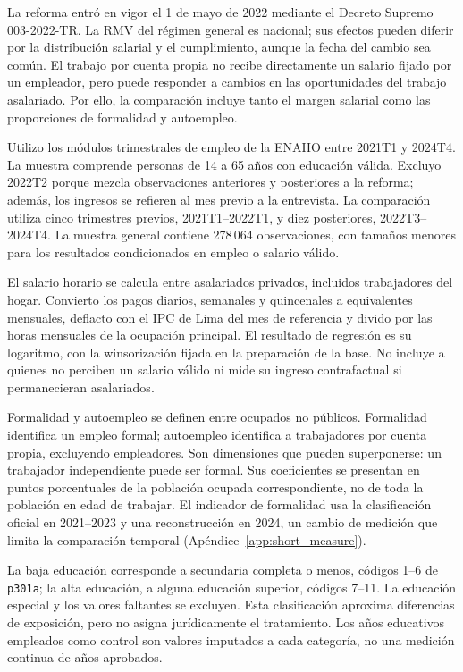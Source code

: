 La reforma entró en vigor el 1 de mayo de 2022 mediante el Decreto Supremo 003-2022-TR. La RMV del régimen general es nacional; sus efectos pueden diferir por la distribución salarial y el cumplimiento, aunque la fecha del cambio sea común. El trabajo por cuenta propia no recibe directamente un salario fijado por un empleador, pero puede responder a cambios en las oportunidades del trabajo asalariado. Por ello, la comparación incluye tanto el margen salarial como las proporciones de formalidad y autoempleo.

Utilizo los módulos trimestrales de empleo de la ENAHO entre 2021T1 y 2024T4. La muestra comprende personas de 14 a 65 años con educación válida. Excluyo 2022T2 porque mezcla observaciones anteriores y posteriores a la reforma; además, los ingresos se refieren al mes previo a la entrevista. La comparación utiliza cinco trimestres previos, 2021T1--2022T1, y diez posteriores, 2022T3--2024T4. La muestra general contiene 278\,064 observaciones, con tamaños menores para los resultados condicionados en empleo o salario válido.

El salario horario se calcula entre asalariados privados, incluidos trabajadores del hogar. Convierto los pagos diarios, semanales y quincenales a equivalentes mensuales, deflacto con el IPC de Lima del mes de referencia y divido por las horas mensuales de la ocupación principal. El resultado de regresión es su logaritmo, con la winsorización fijada en la preparación de la base. No incluye a quienes no perciben un salario válido ni mide su ingreso contrafactual si permanecieran asalariados.

Formalidad y autoempleo se definen entre ocupados no públicos. Formalidad identifica un empleo formal; autoempleo identifica a trabajadores por cuenta propia, excluyendo empleadores. Son dimensiones que pueden superponerse: un trabajador independiente puede ser formal. Sus coeficientes se presentan en puntos porcentuales de la población ocupada correspondiente, no de toda la población en edad de trabajar. El indicador de formalidad usa la clasificación oficial en 2021--2023 y una reconstrucción en 2024, un cambio de medición que limita la comparación temporal (Apéndice~\ref{app:short_measure}).

La baja educación corresponde a secundaria completa o menos, códigos 1--6 de \texttt{p301a}; la alta educación, a alguna educación superior, códigos 7--11. La educación especial y los valores faltantes se excluyen. Esta clasificación aproxima diferencias de exposición, pero no asigna jurídicamente el tratamiento. Los años educativos empleados como control son valores imputados a cada categoría, no una medición continua de años aprobados.

